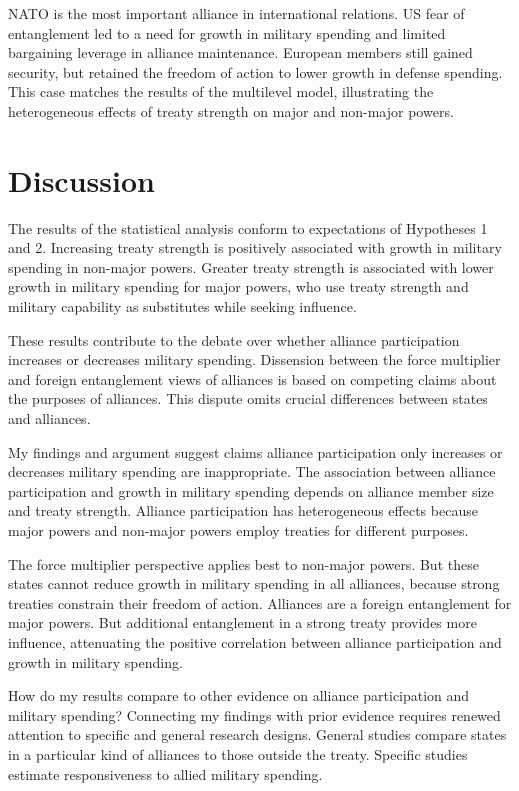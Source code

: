 \documentclass[12pt]{article}
\begin{document}
NATO is the most important alliance in international relations. 
US fear of entanglement led to a need for growth in military spending and limited bargaining leverage in alliance maintenance. 
European members still gained security, but retained the freedom of action to lower growth in defense spending. 
This case matches the results of the multilevel model, illustrating the heterogeneous effects of treaty strength on major and non-major powers. 


\section{Discussion}


The results of the statistical analysis conform to expectations of Hypotheses 1 and 2. 
Increasing treaty strength is positively associated with growth in military spending in non-major powers. 
Greater treaty strength is associated with lower growth in military spending for major powers, who use treaty strength and military capability as substitutes while seeking influence. 


These results contribute to the debate over whether alliance participation increases or decreases military spending. 
Dissension between the force multiplier and foreign entanglement views of alliances is based on competing claims about the purposes of alliances. 
This dispute omits crucial differences between states and alliances. 


My findings and argument suggest claims alliance participation only increases or decreases military spending are inappropriate. 
The association between alliance participation and growth in military spending depends on alliance member size and treaty strength. 
Alliance participation has heterogeneous effects because major powers and non-major powers employ treaties for different purposes. 


The force multiplier perspective applies best to non-major powers. 
But these states cannot reduce growth in military spending in all alliances, because strong treaties constrain their freedom of action.
Alliances are a foreign entanglement for major powers. 
But additional entanglement in a strong treaty provides more influence, attenuating the positive correlation between alliance participation and growth in military spending. 


How do my results compare to other evidence on alliance participation and military spending? 
Connecting my findings with prior evidence requires renewed attention to specific and general research designs. 
General studies compare states in a particular kind of alliances to those outside the treaty. 
Specific studies estimate responsiveness to allied military spending. 
\end{document}

